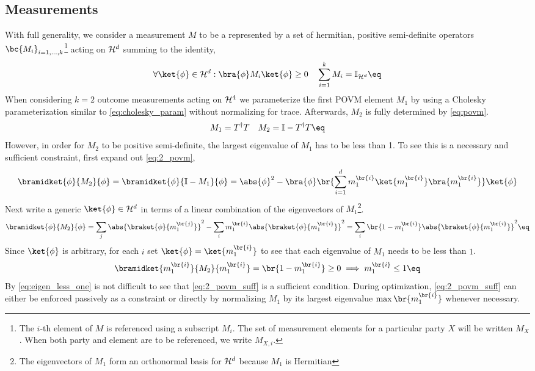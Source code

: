 \documentclass[aps, 10pt, english, twoside, pra, nofootinbib, longbibliography]{revtex4-1}
\begin{document}
    \subsection{Measurements}
    With full generality, we consider a measurement $M$ to be a  represented by a set of hermitian, positive semi-definite operators $\bc{M_i}_{i=1,\ldots,k}$\footnote{The $i$-th element of $M$ is referenced using a subscript $M_i$. The set of measurement elements for a particular party $X$ will be written $M_X$. When both party and element are to be referenced, we write $M_{X,i}$.} acting on $\mathcal{H}^d$ summing to the identity,
    \[ \forall \ket{\phi} \in \Hilb^d : \bra{\phi} M_i \ket{\phi} \geq 0 \quad \sum_{i=1}^{k} M_i = \mathbb{I}_{\Hilb^d} \eq \label{eq:povm} \]
    When considering $k=2$ outcome measurements acting on $\mathcal{H}^4$ we parameterize the first POVM element $M_1$ by using a Cholesky parameterization similar to \cref{eq:cholesky_param} without normalizing for trace. Afterwards, $M_2$ is fully determined by \cref{eq:povm}.
    \[ M_1 = T^\dagger T \quad M_2 = \mathbb{I} - T^\dagger T \eq \label{eq:2_povm}\]
    However, in order for $M_2$ to be positive semi-definite, the largest eigenvalue of $M_1$ has to be less than 1. To see this is a necessary and sufficient constraint, first expand out \cref{eq:2_povm},
    \[ \bramidket{\phi}{M_2}{\phi} = \bramidket{\phi}{\mathbb{I} - M_1}{\phi} = \abs{\phi}^2 - \bra{\phi}\br{\sum_{i=1}^{d}m^{\br{i}}_1 \ket{m^{\br{i}}_1}\bra{m^{\br{i}}_1}}\ket{\phi} \]
    Next write a generic $\ket{\phi} \in \Hilb^d$ in terms of a linear combination of the eigenvectors of $M_1$\footnote{The eigenvectors of $M_1$ form an orthonormal basis for $\mathcal{H}^d$ because $M_1$ is Hermitian}.
    \[ \bramidket{\phi}{M_2}{\phi} = \sum_{j}\abs{\braket{\phi}{m^{\br{j}}_1}}^2 - \sum_{i} m^{\br{i}}_1 \abs{\braket{\phi}{m^{\br{i}}_1}}^2 = \sum_{i} \br{1 - m^{\br{i}}_1} \abs{\braket{\phi}{m^{\br{i}}_1}}^2 \eq \label{eq:eigen_less_one} \]
    Since $\ket{\phi}$ is arbitrary, for each $i$ set $\ket{\phi} = \ket{m^{\br{i}}_1}$ to see that each eigenvalue of $M_1$ needs to be less than $1$.
    \[ \bramidket{m^{\br{i}}_1}{M_2}{m^{\br{i}}_1} = \br{1 - m^{\br{i}}_1} \geq 0 \implies m^{\br{i}}_1 \leq 1 \eq \label{eq:2_povm_suff} \]
    By \cref{eq:eigen_less_one} is not difficult to see that \cref{eq:2_povm_suff} is a sufficient condition. During optimization, \cref{eq:2_povm_suff} can either be enforced passively as a constraint or directly by normalizing $M_1$ by its largest eigenvalue $\max\br{m_1^{\br{i}}}$ whenever necessary.
\end{document}
